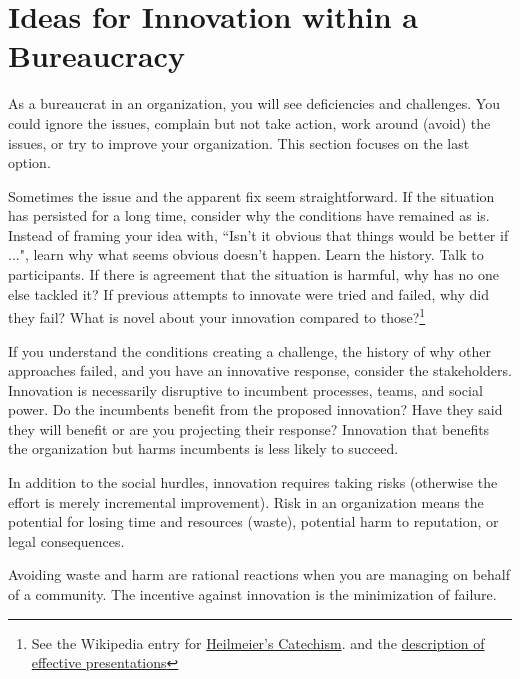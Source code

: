 \section{Ideas for Innovation within a Bureaucracy\label{sec:innovation}}

As a bureaucrat in an organization, you will see deficiencies and challenges. You could ignore the issues, complain but not take action, work around (avoid) the issues, or try to improve your organization. This section focuses on the last option.

Sometimes the issue and the apparent fix seem straightforward. If the situation has persisted for a long time, consider why the conditions have remained as is. 
Instead of framing your idea with, ``Isn't it obvious that things would be better if ...", learn why what seems obvious doesn't happen. 
Learn the history. Talk to participants. If there is agreement that the situation is harmful, why has no one else tackled it? If previous attempts to innovate were tried and failed, why did they fail? What is novel about your innovation compared to those?\footnote{See the Wikipedia entry for  \href{https://en.wikipedia.org/wiki/George_H._Heilmeier\%23Heilmeier's_Catechism}{Heilmeier's Catechism}.
and the \hyperref[sec:effective-presentations]{description of effective presentations}
\iftoggle{haspagenumbers}{ on page~\pageref{sec:effective-presentations}.}{.}
}

If you understand the conditions creating a challenge,  the history of why other approaches failed, and you have an innovative response, consider the stakeholders. 
Innovation is necessarily disruptive to incumbent processes, teams, and social power. 
Do the incumbents benefit from the proposed innovation? Have they said they will benefit or are you projecting their response? 
Innovation that benefits the organization but harms incumbents is less likely to succeed. 

In addition to the social hurdles, innovation requires taking risks (otherwise the effort is merely incremental improvement). Risk in an organization means the potential for losing time and resources (waste), potential harm to reputation, or legal consequences. 

Avoiding waste and harm are rational reactions when you are managing \iftoggle{glossarysubstitutionworks}{\glspl{shared resource}}{shared resources} on behalf 
of a community. The incentive against innovation is the minimization of failure.

